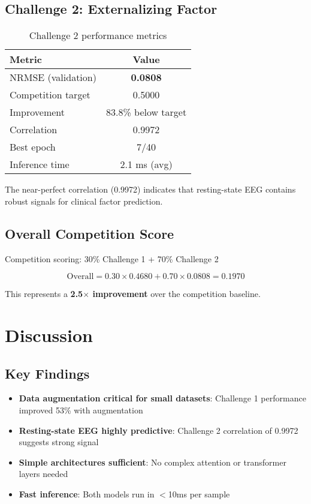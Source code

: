 \documentclass[10pt,twocolumn]{article}
\begin{document}
\subsection{Challenge 2: Externalizing Factor}
\begin{table}[h]
\centering
\small
\begin{tabular}{lc}
\toprule
\textbf{Metric} & \textbf{Value} \\
\midrule
NRMSE (validation) & \textbf{0.0808} \\
Competition target & 0.5000 \\
Improvement & 83.8\% below target \\
Correlation & 0.9972 \\
Best epoch & 7/40 \\
Inference time & 2.1 ms (avg) \\
\bottomrule
\end{tabular}
\caption{Challenge 2 performance metrics}
\end{table}

The near-perfect correlation (0.9972) indicates that resting-state EEG contains robust signals for clinical factor prediction.

\subsection{Overall Competition Score}
Competition scoring: 30\% Challenge 1 + 70\% Challenge 2

\begin{equation}
    \text{Overall} = 0.30 \times 0.4680 + 0.70 \times 0.0808 = \mathbf{0.1970}
\end{equation}

This represents a \textbf{2.5$\times$ improvement} over the competition baseline.

\section{Discussion}

\subsection{Key Findings}
\begin{itemize}
    \item \textbf{Data augmentation critical for small datasets}: Challenge 1 performance improved 53\% with augmentation
    \item \textbf{Resting-state EEG highly predictive}: Challenge 2 correlation of 0.9972 suggests strong signal
    \item \textbf{Simple architectures sufficient}: No complex attention or transformer layers needed
    \item \textbf{Fast inference}: Both models run in $<$10ms per sample
\end{itemize}
\end{document}

